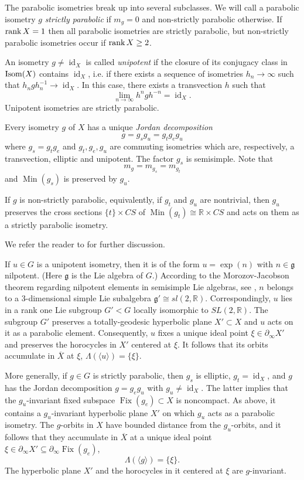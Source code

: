 \documentclass[12pt]{article}
\theoremstyle{boldplain}
\theoremstyle{bolddefinition}
\numberwithin{equation}{section}
\def\R{{\mathbb R}}
\def\La{\Lambda}
\def\Fix{\operatorname{Fix}}
\def\geo{\partial_{\infty}}
\def\id{\operatorname{id}}
\def\Isom{\mathop{\hbox{Isom}}}
\def\Min{\operatorname{Min}}
\def\ol{\overline}
\def\rank{\mathop{\hbox{rank}}}
\def\<{\langle}
\def\>{\rangle}
\begin{document}
The parabolic isometries 
break up into several subclasses.
We will call a parabolic isometry $g$ {\em strictly parabolic} if $m_g=0$ 
and non-strictly parabolic otherwise. 
If $\rank X=1$ then all parabolic isometries are strictly parabolic,
but non-strictly parabolic isometries occur if $\rank X\geq2$.

An isometry $g\ne \id_X$ is called {\em unipotent} 
if the closure of its conjugacy class in $\Isom(X)$ contains $\id_X$,
i.e. if there exists a sequence of isometries $h_n\to\infty$ such that $h_ngh_n^{-1}\to\id_X$.
In this case,
there exists a transvection $h$ such that 
$$
\lim_{n\to\infty} h^n g h^{-n}= \id_X. 
$$
Unipotent isometries are strictly parabolic. 


\medskip
Every isometry $g$ of $X$ has a unique {\em Jordan decomposition}
\begin{equation}\label{eq:Jordan}
g=g_sg_u= g_t g_e  g_u
\end{equation}
where $g_s= g_t g_e$ and 
$g_t, g_e, g_u$ are commuting isometries which are, respectively, a transvection, elliptic and unipotent.
The factor $g_s$ is semisimple. 
Note that 
$$
m_g = m_{g_s} = m_{g_t} 
$$
and $\Min(g_s)$ is preserved by $g_u$.

If $g$ is non-strictly parabolic, equivalently, if $g_t$ and $g_u$ are nontrivial,
then $g_u$ preserves the cross sections $\{t\}\times CS$ of $\Min(g_t)\cong\R\times CS$
and acts on them as a strictly parabolic isometry.


{We refer the reader to \cite{Eberlein} for further discussion. }


\medskip 
If $u\in G$ is a unipotent isometry,
then it is of the form $u=\exp(n)$ with $n\in{\mathfrak g}$ nilpotent. (Here ${\mathfrak g}$ is the Lie algebra of $G$.) 
According to the Morozov-Jacobson theorem
regarding nilpotent elements in semisimple Lie algebras, see \cite{Jacobson},
$n$ belongs to a 3-dimensional simple Lie subalgebra
${\mathfrak g}'\cong sl(2, \R)$.
Correspondingly,
$u$ lies in a rank one Lie subgroup $G'< G$
locally isomorphic to $SL(2, \R)$.
The subgroup $G'$ preserves a totally-geodesic hyperbolic plane $X'\subset X$
and $u$ acts on it as a parabolic element.
Consequently, 
$u$ fixes a unique ideal point $\xi\in\geo X'$ and preserves the horocycles in $X'$ centered at $\xi$.
It follows that its orbits accumulate in $\ol X$ at $\xi$, 
$\La(\<u\>)=\{\xi\}$.

More generally,
if $g\in G$ is strictly parabolic,
then $g_s$ is elliptic, $g_t=\id_X$, 
and $g$ has the Jordan decomposition $g=g_eg_u$ with $g_u\neq \id_X$.
The latter implies that the $g_u$-invariant fixed subspace $\Fix(g_e)\subset X$ is noncompact.
As above, it contains a $g_u$-invariant hyperbolic plane $X'$
on which $g_u$ acts as a parabolic isometry.
The $g$-orbits in $X$ have bounded distance from the $g_u$-orbits,
and it follows that they accumulate in $\ol X$ at a unique ideal point $\xi\in\geo X'\subseteq\geo\Fix(g_e)$,
\begin{equation}
\label{eq:vlimststrpb}
\La(\<g\>)=\{\xi\}.
\end{equation}
The hyperbolic plane $X'$ and the horocycles in it centered at $\xi$ are $g$-invariant. 
\end{document}
